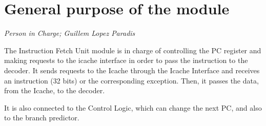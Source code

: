 \newpage
\section{General purpose of the module}
\textit{Person in Charge; Guillem Lopez Paradis}

The Instruction Fetch Unit module is in charge of controlling the PC register  and making requests to the icache interface in order to pass the instruction to the decoder. It sends requests to the Icache through the Icache Interface and receives an instruction (32 bits) or the corresponding exception. Then, it passes the data, from the Icache, to the decoder.

It is also connected to the Control Logic, which can change the next PC, and also to the branch predictor.
